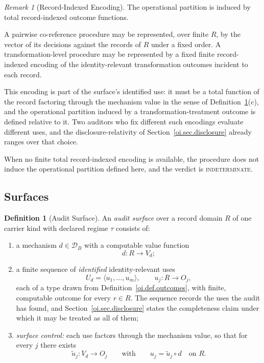 \documentclass[11pt]{article}
\theoremstyle{plain}
\theoremstyle{definition}
\newtheorem{definition}[theorem]{Definition}
\theoremstyle{remark}
\newtheorem{remark}[theorem]{Remark}
\newcommand{\INDET}{\textnormal{\textsc{indeterminate}}}
\begin{document}
\begin{remark}[Record-Indexed Encoding]
  \label{oi.rem.record-indexed}
  The operational partition is induced by total record-indexed outcome functions.

  A pairwise co-reference procedure may be represented,
  over finite \(R\), by the vector of its decisions against the records of \(R\)
  under a fixed order.
  A transformation-level procedure may be represented by a fixed finite record-indexed encoding
  of the identity-relevant transformation outcomes incident to each record.

  This encoding is part of the surface's identified use:
  it must be a total function of the record
  factoring through the mechanism value
  in the sense of Definition~\ref{oi.def.surface}(c),
  and the operational partition
  induced by a transformation-treatment outcome
  is defined relative to it.
  Two auditors who fix different such encodings
  evaluate different uses,
  and the disclosure-relativity of
  Section~\ref{oi.sec.disclosure} already ranges over that choice.

  When no finite total record-indexed encoding is available,
  the procedure does not induce the operational partition defined here,
  and the verdict is \INDET{}.
\end{remark}

\subsection{Surfaces}

\begin{definition}[Audit Surface]
  \label{oi.def.surface}
  An \emph{audit surface} over a record domain \(R\)
  of one carrier kind with declared regime \(\tau\) consists of:
  \begin{enumerate}[label=(\alph*)]
    \item a mechanism \(d\in\mathcal{D}_B\) with a computable value function
          \[
            d:R\longrightarrow V_d;
          \]
    \item a finite sequence of \emph{identified} identity-relevant uses
          \[
            U_d
            =
            \langle u_1,\ldots,u_m\rangle,
            \qquad
            u_j:R\longrightarrow O_j,
          \]
          each of a type drawn from Definition~\ref{oi.def.outcomes},
          with finite, computable outcome for every \(r\in R\).
          The sequence records the uses the audit has found,
          and Section~\ref{oi.sec.disclosure} states the completeness claim
          under which it may be treated as all of them;
    \item \emph{surface control:} each use factors through the mechanism value,
          so that for every \(j\) there exists
          \[
            \tilde{u}_j:V_d\longrightarrow O_j
            \qquad\text{with}\qquad
            u_j=\tilde{u}_j\circ d
            \quad\text{on }R.
          \]
  \end{enumerate}
\end{definition}
\end{document}
